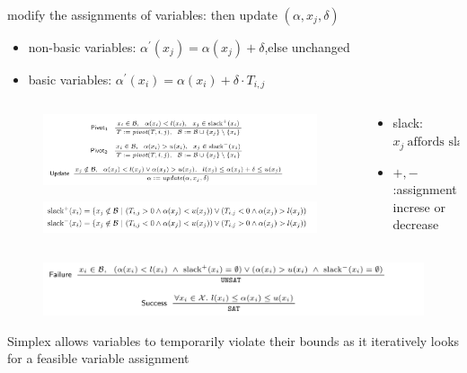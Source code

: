 \documentclass[aspectratio=169%
,serif,mathserif]{beamer}
\begin{document}
\begin{frame}
	modify the assignments of variables: then update $(\alpha, x_j , \delta)$
	\begin{itemize}
		\item non-basic variables: $\alpha^{\prime}\left(x_{j}\right)=\alpha\left(x_{j}\right)+\delta$,else unchanged
		\item basic variables: $\alpha^{\prime}\left(x_{i}\right)=\alpha\left(x_{i}\right)+\delta \cdot T_{i, j}$
	\end{itemize}


\end{frame}

\begin{frame}
	\begin{columns}
		\begin{column}{.65\textwidth}
			\begin{figure}[htbp]
				\includegraphics[width=1\linewidth]{1.png}
			\end{figure}

			\begin{figure}[htbp]
				\includegraphics[width=1\linewidth]{2.png}
			\end{figure}
		\end{column}

		\begin{column}{.35\textwidth}
			\begin{itemize}
				\item slack: $x_j~\text{affords slack} \to x_i \text{closer to bound}$
				\item $+,-$ :assignment increse or decrease
			\end{itemize}
		\end{column}
	\end{columns}
\end{frame}


\begin{frame}
	\begin{figure}[htbp]
		\includegraphics[width=1\linewidth]{3.png}
	\end{figure}
	Simplex allows variables to temporarily violate their bounds as it iteratively looks for a feasible variable assignment
\end{frame}
\end{document}
